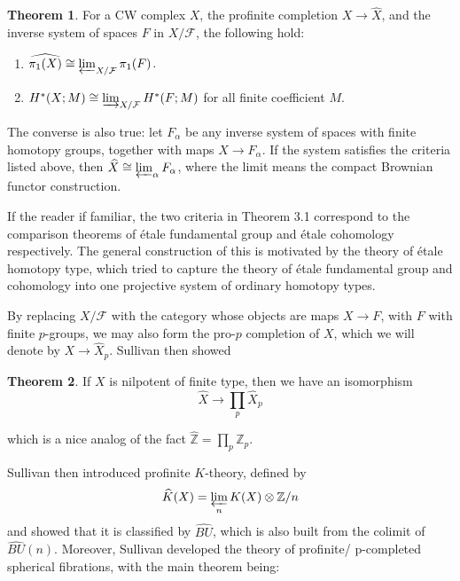 \documentclass{article}
\theoremstyle{definition}
\newtheorem{theorem}{Theorem}[section]
\theoremstyle{definition}
\theoremstyle{definition}
\theoremstyle{definition}
\theoremstyle{definition}
\theoremstyle{definition}
\theoremstyle{definition}
\begin{document}
\begin{tcolorbox}[colback=red!5!white,colframe=red!30!white]
\begin{theorem}
For a CW complex $X$, the profinite completion $X\to \widehat{X}$, and the inverse system of spaces ${F}$ in $X/\mathcal{F}$, the following hold:
\begin{enumerate}
	\item $\widehat{\pi_1(X)}\cong \varprojlim_{X/\mathcal{F}}\pi_1(F)$.
	\item $H^*(X;M)\cong \varinjlim_{X/\mathcal{F}}H^*(F;M)$ for all finite coefficient $M$.
\end{enumerate}
The converse is also true: let ${F_{\alpha}}$ be any inverse system of spaces with finite homotopy groups, together with maps $X\to F_{\alpha}$. If the system satisfies the criteria listed above, then $\widehat{X}\cong \varprojlim_{\alpha} F_{\alpha}$, where the limit means the compact Brownian functor construction.
\end{theorem}
\end{tcolorbox}

If the reader if familiar, the two criteria in Theorem 3.1 correspond to the comparison theorems of \'etale fundamental group and  \'etale cohomology respectively. The general construction of this is motivated by the theory of \'etale homotopy type, which tried to capture the theory of \'etale fundamental group and cohomology into one projective system of ordinary homotopy types.

By replacing $X/\mathcal{F}$ with the category whose objects are maps $X\to F$, with $F$ with finite $p$-groups, we may also form the pro-$p$ completion of $X$, which we will denote by $X\to \widehat{X}_p$. Sullivan then showed

\begin{tcolorbox}[colback=red!5!white,colframe=red!30!white]
\begin{theorem}
If $X$ is nilpotent of finite type, then we have an isomorphism 
\[\widehat{X}\to \prod_p \widehat{X}_p\]
\end{theorem}
\end{tcolorbox}
which is a nice analog of the fact $\widehat{\mathbb{Z}}=\prod_p \mathbb{Z}_p$.








Sullivan then introduced profinite $K$-theory, defined by 
\[\widehat{K}(X)=\varprojlim_n K(X)\otimes \mathbb{Z}/n\]
and showed that it is classified by $\widehat{BU}$, which is also built from the colimit of $\widehat{BU}(n)$. Moreover, Sullivan developed the theory of profinite/ p-completed spherical fibrations, with the main theorem being:
\end{document}
